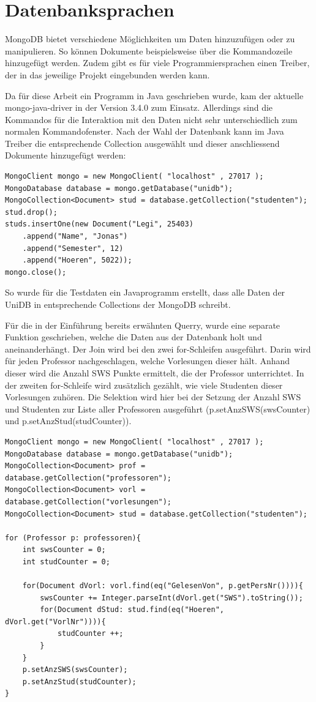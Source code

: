 \section{Datenbanksprachen}
\label{kap:Datenbanksprachen}
 
MongoDB bietet verschiedene Möglichkeiten um Daten hinzuzufügen oder zu manipulieren. So können Dokumente beispielsweise über die Kommandozeile hinzugefügt werden. Zudem gibt es für viele Programmiersprachen einen Treiber, der in das jeweilige Projekt eingebunden werden kann. 
 
Da für diese Arbeit ein Programm in Java geschrieben wurde, kam der aktuelle mongo-java-driver in der Version 3.4.0 zum Einsatz. Allerdings sind die Kommandos für die Interaktion mit den Daten nicht sehr unterschiedlich zum normalen Kommandofenster. Nach der Wahl der Datenbank kann im Java Treiber  die entsprechende Collection ausgewählt und dieser anschliessend Dokumente hinzugefügt werden:
 
\begin{lstlisting}[basicstyle=\scriptsize]
MongoClient mongo = new MongoClient( "localhost" , 27017 );
MongoDatabase database = mongo.getDatabase("unidb");
MongoCollection<Document> stud = database.getCollection("studenten");
stud.drop();
studs.insertOne(new Document("Legi", 25403)
	.append("Name", "Jonas")
	.append("Semester", 12)
	.append("Hoeren", 5022));
mongo.close();
\end{lstlisting}

So wurde für die Testdaten ein Javaprogramm erstellt, dass alle Daten der UniDB in entsprechende Collections der MongoDB schreibt.

Für die in der Einführung bereits erwähnten Querry, wurde eine separate Funktion geschrieben, welche die Daten aus der Datenbank holt und aneinanderhängt. Der Join wird bei den zwei for-Schleifen ausgeführt. Darin wird für jeden Professor nachgeschlagen, welche Vorlesungen dieser hält. Anhand dieser wird die Anzahl SWS Punkte ermittelt, die der Professor unterrichtet. In der zweiten for-Schleife wird zusätzlich gezählt, wie viele Studenten dieser Vorlesungen zuhören. Die Selektion wird hier bei der Setzung der Anzahl SWS und Studenten zur Liste aller Professoren ausgeführt (p.setAnzSWS(swsCounter) und p.setAnzStud(studCounter)). 

\begin{lstlisting}[basicstyle=\scriptsize]
MongoClient mongo = new MongoClient( "localhost" , 27017 );
MongoDatabase database = mongo.getDatabase("unidb");
MongoCollection<Document> prof = database.getCollection("professoren");
MongoCollection<Document> vorl = database.getCollection("vorlesungen");
MongoCollection<Document> stud = database.getCollection("studenten");

for (Professor p: professoren){
	int swsCounter = 0;
	int studCounter = 0;
	
	for(Document dVorl: vorl.find(eq("GelesenVon", p.getPersNr()))){
		swsCounter += Integer.parseInt(dVorl.get("SWS").toString());
		for(Document dStud: stud.find(eq("Hoeren", dVorl.get("VorlNr")))){
			studCounter ++;
		}
	}
	p.setAnzSWS(swsCounter);
	p.setAnzStud(studCounter);
}
\end{lstlisting}
 
